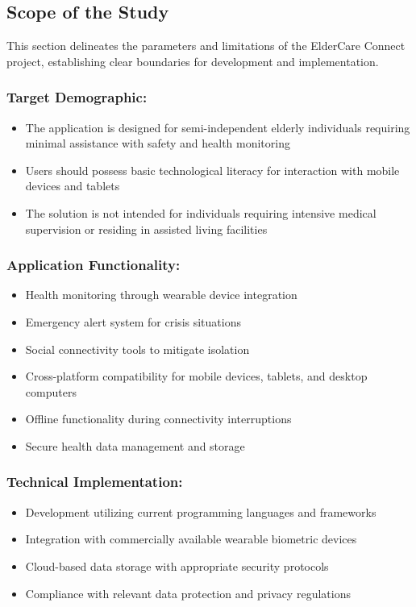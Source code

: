 \subsection{Scope of the Study}

This section delineates the parameters and limitations of the ElderCare Connect project, establishing clear boundaries for development and implementation.

\subsubsection*{Target Demographic:}
\begin{itemize}
    \item The application is designed for semi-independent elderly individuals requiring minimal assistance with safety and health monitoring
    \item Users should possess basic technological literacy for interaction with mobile devices and tablets
    \item The solution is not intended for individuals requiring intensive medical supervision or residing in assisted living facilities
\end{itemize}

\subsubsection*{Application Functionality:}
\begin{itemize}
    \item Health monitoring through wearable device integration
    \item Emergency alert system for crisis situations
    \item Social connectivity tools to mitigate isolation
    \item Cross-platform compatibility for mobile devices, tablets, and desktop computers
    \item Offline functionality during connectivity interruptions
    \item Secure health data management and storage
\end{itemize}

\subsubsection*{Technical Implementation:}
\begin{itemize}
    \item Development utilizing current programming languages and frameworks
    \item Integration with commercially available wearable biometric devices
    \item Cloud-based data storage with appropriate security protocols
    \item Compliance with relevant data protection and privacy regulations
\end{itemize}

